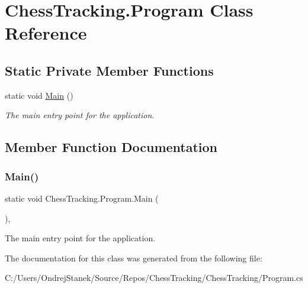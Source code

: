 \hypertarget{class_chess_tracking_1_1_program}{}\section{Chess\+Tracking.\+Program Class Reference}
\label{class_chess_tracking_1_1_program}
\subsection*{Static Private Member Functions}
\begin{DoxyCompactItemize}
\item 
static void \mbox{\hyperlink{class_chess_tracking_1_1_program_a0b986a15e53f8695f3a56df8446e2a1e}{Main}} ()
\begin{DoxyCompactList}\small\item\em The main entry point for the application. \end{DoxyCompactList}\end{DoxyCompactItemize}


\subsection{Member Function Documentation}
\mbox{\label{class_chess_tracking_1_1_program_a0b986a15e53f8695f3a56df8446e2a1e}} 
\subsubsection{\texorpdfstring{Main()}{Main()}}
{\footnotesize\ttfamily static void Chess\+Tracking.\+Program.\+Main (\begin{DoxyParamCaption}{ }\end{DoxyParamCaption})\hspace{0.3cm}{\ttfamily [static]}, {\ttfamily [private]}}



The main entry point for the application. 



The documentation for this class was generated from the following file\+:\begin{DoxyCompactItemize}
\item 
C\+:/\+Users/\+Ondrej\+Stanek/\+Source/\+Repos/\+Chess\+Tracking/\+Chess\+Tracking/Program.\+cs\end{DoxyCompactItemize}
